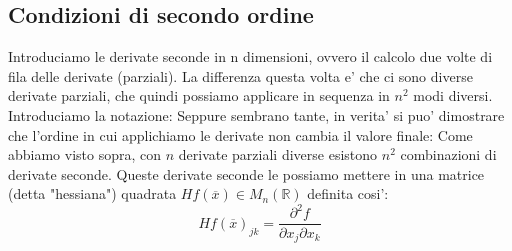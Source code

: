 \documentclass{report}
\begin{document}
\subsection{Condizioni di secondo ordine}
Introduciamo le derivate seconde in n dimensioni, ovvero il calcolo due volte di fila delle derivate (parziali). La differenza questa volta e' che ci sono diverse derivate parziali, che quindi possiamo applicare in sequenza in $ n^2 $ modi diversi. Introduciamo la notazione:
Seppure sembrano tante, in verita' si puo' dimostrare che l'ordine in cui applichiamo le derivate non cambia il valore finale:
Come abbiamo visto sopra, con $ n $ derivate parziali diverse esistono $ n^2 $ combinazioni di derivate seconde. Queste derivate seconde le possiamo mettere in una matrice (detta "hessiana") quadrata $ Hf(\overline{x}) \in M_n(\mathbb{R}) $ definita cosi':
\[
  Hf(\overline{x})_{jk} = \frac{\partial^2 f}{\partial x_j \partial x_k }
\]
\end{document}
